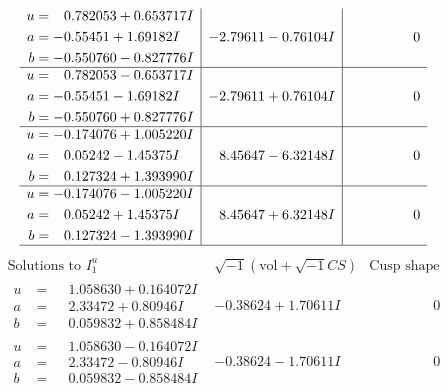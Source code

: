 \documentclass[1p]{elsarticle_modified}
\theoremstyle{definition}
\newcommand{\I}{\sqrt{-1}}
\begin{document}
$$\begin{array}{c|c|c}
\begin{aligned}
u &= \phantom{-}0.782053 + 0.653717 I \\
a &= -0.55451 + 1.69182 I \\
b &= -0.550760 - 0.827776 I\end{aligned}
 & -2.79611 - 0.76104 I & \phantom{-0.000000 } 0 \\ \hline\begin{aligned}
u &= \phantom{-}0.782053 - 0.653717 I \\
a &= -0.55451 - 1.69182 I \\
b &= -0.550760 + 0.827776 I\end{aligned}
 & -2.79611 + 0.76104 I & \phantom{-0.000000 } 0 \\ \hline\begin{aligned}
u &= -0.174076 + 1.005220 I \\
a &= \phantom{-}0.05242 - 1.45375 I \\
b &= \phantom{-}0.127324 + 1.393990 I\end{aligned}
 & \phantom{-}8.45647 - 6.32148 I & \phantom{-0.000000 } 0 \\ \hline\begin{aligned}
u &= -0.174076 - 1.005220 I \\
a &= \phantom{-}0.05242 + 1.45375 I \\
b &= \phantom{-}0.127324 - 1.393990 I\end{aligned}
 & \phantom{-}8.45647 + 6.32148 I & \phantom{-0.000000 } 0\\
 \hline 
 \end{array}$$\newpage$$\begin{array}{c|c|c}  
\text{Solutions to }I^u_{1}& \I (\text{vol} + \sqrt{-1}CS) & \text{Cusp shape}\\
 \hline 
\begin{aligned}
u &= \phantom{-}1.058630 + 0.164072 I \\
a &= \phantom{-}2.33472 + 0.80946 I \\
b &= \phantom{-}0.059832 + 0.858484 I\end{aligned}
 & -0.38624 + 1.70611 I & \phantom{-0.000000 } 0 \\ \hline\begin{aligned}
u &= \phantom{-}1.058630 - 0.164072 I \\
a &= \phantom{-}2.33472 - 0.80946 I \\
b &= \phantom{-}0.059832 - 0.858484 I\end{aligned}
 & -0.38624 - 1.70611 I & \phantom{-0.000000 } 0 \\ \hline\begin{aligned}

\end{aligned}
\end{array}$$
\end{document}
